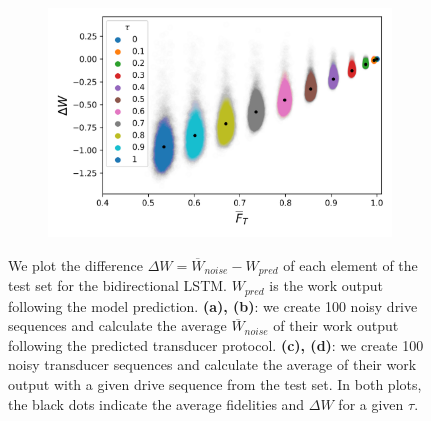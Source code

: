 \begin{figure}[h]
\begin{subfigure}{0.4\textwidth}
	\end{subfigure}
	\begin{subfigure}{0.4\textwidth}
		\centering
		\includegraphics[width=\textwidth]{img/noisy_trans_dt_1}
	\end{subfigure}
	\caption{We plot the difference $\Delta W = \overline{W}_{noise} - W_{pred}$ of each element of the test set for the bidirectional LSTM. $W_{pred}$ is the work output following the model prediction. \textbf{(a), (b)}: we create 100 noisy drive sequences and calculate the average $\overline{W}_{noise}$ of their work output following the predicted transducer protocol. \textbf{(c), (d)}: we create 100 noisy transducer sequences and calculate the average of their work output with a given drive sequence from the test set. In both plots, the black dots indicate the average fidelities and $\Delta W$ for a given $\tau$.}
	\label{noisedt5}
\end{figure}